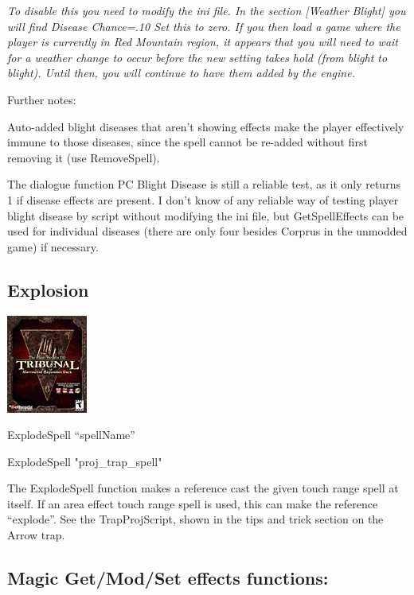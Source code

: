 \documentclass[
]{article}
\begin{document}
\emph{To disable this you need to modify the ini file. In the section
{[}Weather Blight{]} you will find Disease Chance=.10 Set this to zero.
If you then load a game where the player is currently in Red Mountain
region, it appears that you will need to wait for a weather change to
occur before the new setting takes hold (from blight to blight). Until
then, you will continue to have them added by the engine.}

Further notes:

Auto-added blight diseases that aren't showing effects make the player
effectively immune to those diseases, since the spell cannot be re-added
without first removing it (use RemoveSpell).

The dialogue function PC Blight Disease is still a reliable test, as it
only returns 1 if disease effects are present. I don't know of any
reliable way of testing player blight disease by script without
modifying the ini file, but GetSpellEffects can be used for individual
diseases (there are only four besides Corprus in the unmodded game) if
necessary.

\hypertarget{explosion}{%
\subsection{Explosion}\label{explosion}}

\includegraphics{media/image6.png}

ExplodeSpell ``spellName''

ExplodeSpell "proj\_trap\_spell"

The ExplodeSpell function makes a reference cast the given touch range
spell at itself. If an area effect touch range spell is used, this can
make the reference ``explode''. See the TrapProjScript, shown in the
tips and trick section on the Arrow trap.

\hypertarget{magic-getmodset-effects-functions}{%
\subsection{Magic Get/Mod/Set effects
functions:}\label{magic-getmodset-effects-functions}}
\end{document}
